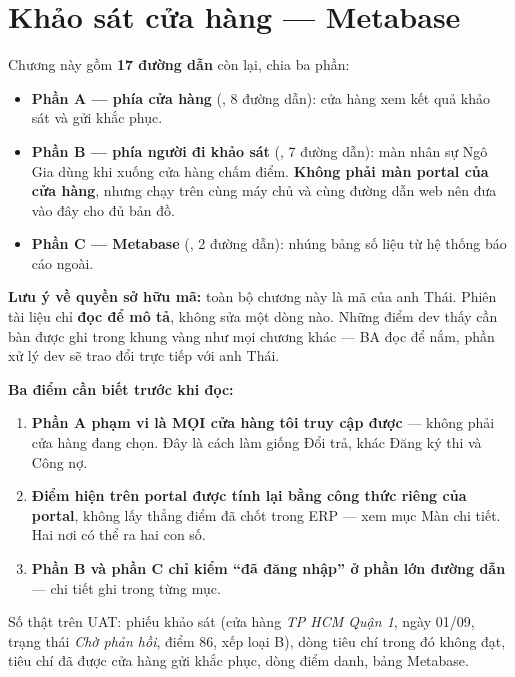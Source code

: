 \chapter{Khảo sát cửa hàng --- Metabase}

Chương này gồm \textbf{17 đường dẫn} còn lại, chia ba phần:

\begin{itemize}[leftmargin=*]
  \item \textbf{Phần A --- phía cửa hàng} (, 8 đường dẫn): cửa hàng
        xem kết quả khảo sát và gửi khắc phục.
  \item \textbf{Phần B --- phía người đi khảo sát} (, 7 đường
        dẫn): màn nhân sự Ngô Gia dùng khi xuống cửa hàng chấm điểm. \textbf{Không phải màn
        portal của cửa hàng}, nhưng chạy trên cùng máy chủ và cùng đường dẫn web nên đưa vào
        đây cho đủ bản đồ.
  \item \textbf{Phần C --- Metabase} (, 2 đường dẫn): nhúng bảng
        số liệu từ hệ thống báo cáo ngoài.
\end{itemize}

\textbf{Lưu ý về quyền sở hữu mã:} toàn bộ chương này là mã của anh Thái. Phiên tài liệu chỉ
\textbf{đọc để mô tả}, không sửa một dòng nào. Những điểm dev thấy cần bàn được ghi trong khung
vàng như mọi chương khác --- BA đọc để nắm, phần xử lý dev sẽ trao đổi trực tiếp với anh Thái.

\textbf{Ba điểm cần biết trước khi đọc:}

\begin{enumerate}[leftmargin=*]
  \item \textbf{Phần A phạm vi là MỌI cửa hàng tôi truy cập được} --- không phải cửa hàng đang
        chọn. Đây là cách làm giống Đổi trả, khác Đăng ký thi và Công nợ.
  \item \textbf{Điểm hiện trên portal được tính lại bằng công thức riêng của portal}, không lấy
        thẳng điểm đã chốt trong ERP --- xem mục Màn chi tiết. Hai nơi có thể ra hai con số.
  \item \textbf{Phần B và phần C chỉ kiểm ``đã đăng nhập'' ở phần lớn đường dẫn} --- chi tiết
        ghi trong từng mục.
\end{enumerate}

Số thật trên UAT:  phiếu khảo sát (cửa hàng \emph{TP HCM Quận 1}, ngày 01/09, trạng thái
\emph{Chờ phản hồi}, điểm 86, xếp loại B),  dòng tiêu chí trong đó  không đạt,
 tiêu chí đã được cửa hàng gửi khắc phục,  dòng điểm danh,  bảng Metabase.

